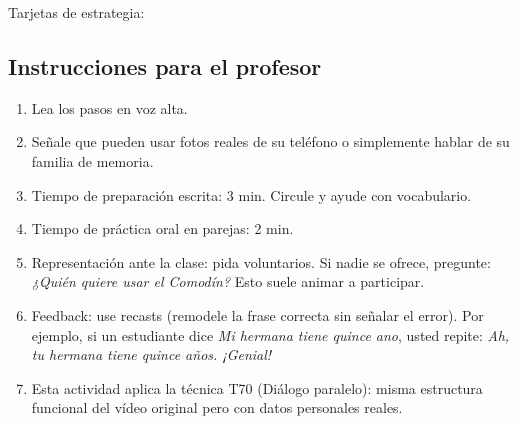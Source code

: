 \documentclass[a4paper,11pt]{article}
\begin{document}
Tarjetas de estrategia:

\begin{center}
\end{center}

\vspace{0.5cm}

\subsection*{Instrucciones para el profesor}

\begin{enumerate}[leftmargin=1.5cm, itemsep=4pt]
\item Lea los pasos en voz alta.
\item Señale que pueden usar fotos reales de su teléfono o simplemente hablar de su familia de memoria.
\item Tiempo de preparación escrita: 3 min. Circule y ayude con vocabulario.
\item Tiempo de práctica oral en parejas: 2 min.
\item Representación ante la clase: pida voluntarios. Si nadie se ofrece, pregunte: \textit{¿Quién quiere usar el Comodín?} Esto suele animar a participar.
\item Feedback: use recasts (remodele la frase correcta sin señalar el error). Por ejemplo, si un estudiante dice \textit{Mi hermana tiene quince ano}, usted repite: \textit{Ah, tu hermana tiene quince años. ¡Genial!}
\item Esta actividad aplica la técnica T70 (Diálogo paralelo): misma estructura funcional del vídeo original pero con datos personales reales.
\end{enumerate}
\end{document}
